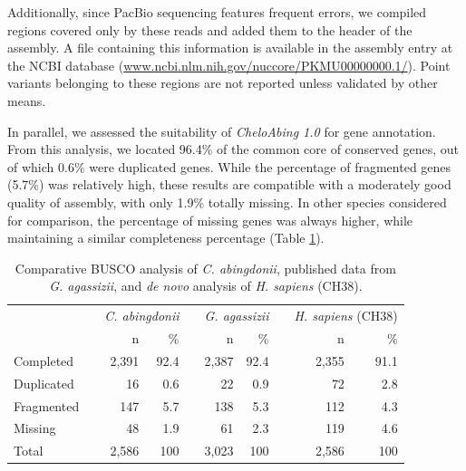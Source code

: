 Additionally, since PacBio sequencing features frequent errors, we compiled regions covered only by these reads and added them to the header of the assembly.
A file containing this information is available in the assembly entry at the NCBI database (\href{https://www.ncbi.nlm.nih.gov/nuccore/PKMU00000000.1/}{www.ncbi.nlm.nih.gov/nuccore/PKMU00000000.1/}).
Point variants belonging to these regions are not reported unless validated by other means.

In parallel, we assessed the suitability of \emph{CheloAbing 1.0} for gene annotation.
From this analysis, we located 96.4\% of the common core of conserved genes, out of which 0.6\% were duplicated genes.
While the percentage of fragmented genes (5.7\%) was relatively high, these results are compatible with a moderately good quality of assembly, with only 1.9\% totally missing.
In other species considered for comparison, the percentage of missing genes was always higher, while maintaining a similar completeness percentage (Table \ref{t_george_busco}).

\begin{table}[h]
    \centering
    \caption[Comparative BUSCO analysis of \textit{C. abingdonii}]{\footnotesize Comparative BUSCO analysis of \textit{C. abingdonii}, published data from \textit{G. agassizii}, and \textit{de novo} analysis of \textit{H. sapiens} (CH38).}
    \begin{tabular}{lrrrrrrrrr}
        \hline \hline
        & & \multicolumn{2}{c}{\textit{C. abingdonii}} & & \multicolumn{2}{c}{\textit{G. agassizii}} & & \multicolumn{2}{c}{\textit{H. sapiens} (CH38)} \\
        \cline{3-4} \cline{6-7} \cline{9-10}
        & & n & \% & & n & \% & & n & \% \\ \hline \hline
        \multicolumn{1}{l}{Completed}    & & 2,391 & 92.4  & & 2,387 & 92.4  & & 2,355 & 91.1 \\
        \multicolumn{1}{l}{Duplicated}   & & 16    & 0.6   & & 22    & 0.9   & & 72    & 2.8 \\
        \multicolumn{1}{l}{Fragmented}   & & 147   & 5.7   & & 138   & 5.3   & & 112   & 4.3 \\
        \multicolumn{1}{l}{Missing}      & & 48    & 1.9   & & 61    & 2.3   & & 119   & 4.6 \\ \hline
        \multicolumn{1}{l}{Total}        & & 2,586 & 100   & & 3,023 & 100   & & 2,586 & 100 \\ \hline \hline
    \end{tabular}
    \label{t_george_busco}
\end{table}

